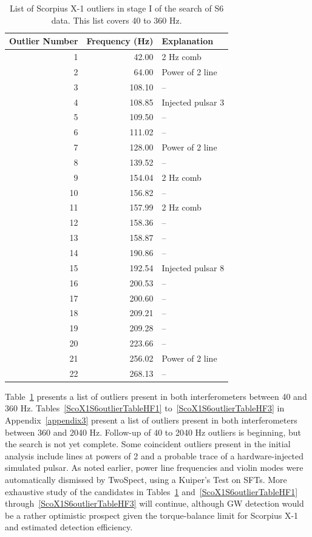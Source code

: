 \begin{table}
\begin{center}
\begin{tabular}{r r l}
Outlier Number & Frequency (Hz) & Explanation \\
\hline
1 & 42.00 & 2 Hz comb \\
2 & 64.00 & Power of 2 line \\
3 & 108.10 & -- \\
4 & 108.85 & Injected pulsar 3 \\
5 & 109.50 & -- \\
6 & 111.02 & -- \\
7 & 128.00 & Power of 2 line \\
8 & 139.52 & -- \\
9 & 154.04 & 2 Hz comb \\
10 & 156.82 & -- \\
11 & 157.99 & 2 Hz comb \\
12 & 158.36 & -- \\
13 & 158.87 & -- \\
14 & 190.86 & -- \\
15 & 192.54 & Injected pulsar 8 \\
16 & 200.53 & -- \\
17 & 200.60 & -- \\
18 & 209.21 & -- \\
19 & 209.28 & -- \\
20 & 223.66 & -- \\
21 & 256.02 & Power of 2 line \\
22 & 268.13 & -- \\
\end{tabular}
\caption{List of Scorpius X-1 outliers in stage I of the search of S6 data. This list covers 40 to 360 Hz.}
\label{ScoX1S6outlierTable}
\end{center}
\end{table}



Table~\ref{ScoX1S6outlierTable} presents a list of outliers present in both interferometers between 40 and 360 Hz.
Tables~\ref{ScoX1S6outlierTableHF1} to~\ref{ScoX1S6outlierTableHF3} in Appendix~\ref{appendix3} present a list of outliers present in both interferometers between 360 and 2040 Hz.
Follow-up of 40 to 2040 Hz outliers is beginning, but the search is not yet complete.
Some coincident outliers present in the initial analysis include lines at powers of 2 and a probable trace of a hardware-injected simulated pulsar.
As noted earlier, power line frequencies and violin modes were automatically dismissed by TwoSpect, using a Kuiper's Test on SFTs.
More exhaustive study of the candidates in Tables~\ref{ScoX1S6outlierTable} and~\ref{ScoX1S6outlierTableHF1} through~\ref{ScoX1S6outlierTableHF3} will continue, although GW detection would be a rather optimistic prospect given the torque-balance limit for Scorpius X-1~\cite{Bildsten1998} and estimated detection efficiency.

